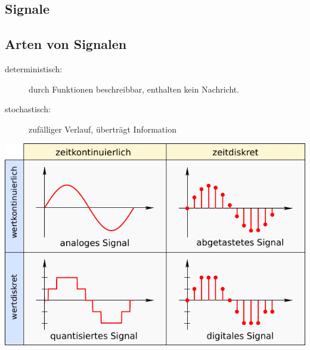 \documentclass[fs, footer]{latex4ei}
\begin{document}
\begin{multicols*}{4}




\section{Signale}
	\subsection{Arten von Signalen}
	\begin{description}
		\item[deterministisch:] durch Funktionen beschreibbar, enthalten kein Nachricht.
		\item[stochastisch:] zufälliger Verlauf, überträgt Information
	\end{description}
	
	
	\includegraphics[width = \columnwidth]{./img/signals.pdf}




\end{multicols*}
\end{document}
